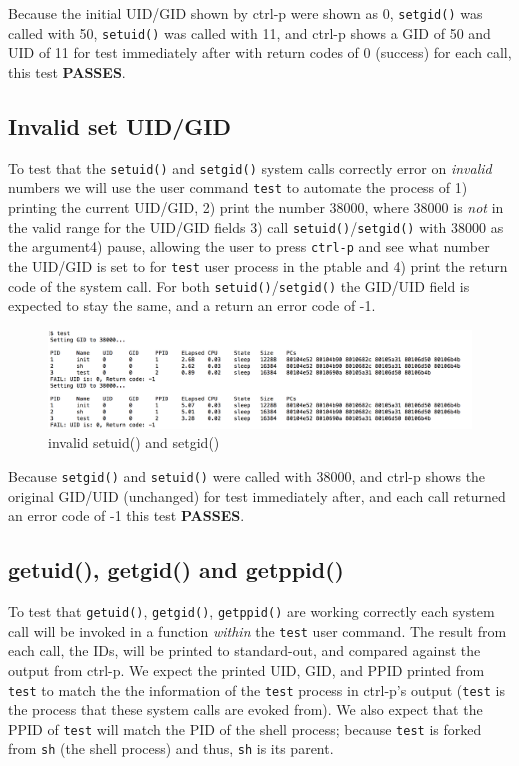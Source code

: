 \documentclass[11pt,letterpaper]{report}
\begin{document}
	Because the initial UID/GID shown by ctrl-p were shown as 0, {\tt setgid()} was called with 50, {\tt setuid()} was called with 11, and ctrl-p shows a GID of 50 and UID of 11 for test immediately after with return codes of $0$ (success) for each call, this test \textbf{PASSES}.


	\subsection*{Invalid set UID/GID}
	To test that the {\tt setuid()} and {\tt setgid()} system calls correctly error on \emph{invalid} numbers we will use the user command {\tt test} to automate the process of 1) printing 
	the current UID/GID, 2) print the number $38000$, where $38000$ is \emph{not} in the valid range for the UID/GID fields 3) call {\tt setuid()}/{\tt setgid()}  with $38000$ as the argument4) pause, allowing the user to 		press {\tt ctrl-p} and see what number the UID/GID is set to for {\tt test} user process in the ptable and 4) print the return code of the system call. 
	For both {\tt setuid()}/{\tt setgid()} the GID/UID field is expected to stay the same, and a return an error code of -1.
	
	
\begin{figure}[h!]
\centering
\includegraphics[width=0.8\linewidth]{invalid-setuid.png}
\caption[invalid setuid() and setgid()]{invalid setuid() and setgid()}
\label{fig:datetest}
\end{figure}	
	Because {\tt setgid()} and {\tt setuid()} were called with 38000, and ctrl-p shows the original GID/UID (unchanged) for test immediately after, and each call returned an
	error code of -1 this test \textbf{PASSES}.

\newpage	

\subsection*{getuid(), getgid() and getppid()}
	To test that {\tt getuid()}, {\tt getgid()}, {\tt getppid()} are working correctly each system call will be invoked in a function \emph{within} the {\tt test} user command. The result
	from each call, the IDs, will be printed to standard-out, and compared against the output from ctrl-p. We expect the printed UID, GID, and PPID printed from {\tt test} to match the 
	the information of the {\tt test} process in ctrl-p's output ({\tt test} is the process that these system calls are evoked from). We also expect that the PPID of {\tt test} will match the PID of 
	the shell process; because {\tt test} is forked from {\tt sh} (the shell process) and thus, {\tt sh} is its parent.
\end{document}
